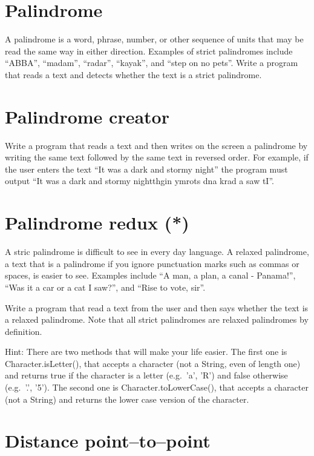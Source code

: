 \documentclass{article}
\begin{document}
\section{Palindrome}
\label{sec:palindrome}

A palindrome is a word, phrase, number, or other sequence of units
that may be read the same way in either direction. Examples of strict
palindromes include ``ABBA'', ``madam'', ``radar'', ``kayak'', and
``step on no pets''. Write a program
that reads a text and detects whether the text is a strict palindrome.

\section{Palindrome creator}
\label{sec:palindrome-creator}

Write a program that reads a text and then writes on the screen a
palindrome by writing the same text followed by the same text in
reversed order. For example, if the user enters the text ``It was a
dark and stormy night'' the program must output ``It was a dark and
stormy nightthgin ymrots dna krad a saw tI''. 

\section{Palindrome redux (*)}
\label{sec:palindrome-redux}

A stric palindrome is difficult to see in every day language. A
relaxed palindrome, a text that is a palindrome if you ignore
punctuation marks such as commas or spaces, is easier to see. Examples
include ``A man, a plan, a canal - Panama!'', ``Was it a car or a cat
I saw?'', and ``Rise to vote, sir''. 

Write a program that read a text from the user and then says whether
the text is a relaxed palindrome. Note that all strict palindromes are
relaxed palindromes by definition. 

Hint: There are two methods that will make your life easier. The first
one is Character.isLetter(), that accepts a character (not a String,
even of length one) and returns true if the character is a letter
(e.g.~'a', 'R') and false otherwise (e.g.~'.', '5'). The second one is
Character.toLowerCase(), that accepts a character (not a String) and
returns the lower case version of the character. 

\section{Distance point--to--point}
\label{sec:distance-point-point}
\end{document}
